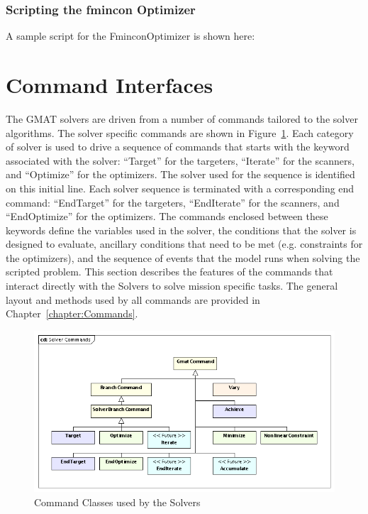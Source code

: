 \begin{quote}
\end{quote}

\subsubsection{Scripting the fmincon Optimizer}

A sample script for the FminconOptimizer is shown here:

\begin{quote}
\end{quote}

\section{Command Interfaces}

The GMAT solvers are driven from a number of commands tailored to the solver algorithms.  The solver
specific commands are shown in Figure~\ref{figure:SolverCommandClasses}.  Each
category of solver is used to drive a sequence of commands that starts with the keyword associated
with the solver: ``Target'' for the targeters, ``Iterate'' for the scanners, and ``Optimize'' for
the optimizers.  The solver used for the sequence is identified on this initial line.  Each solver
sequence is terminated with a corresponding end command: ``EndTarget'' for the targeters,
``EndIterate'' for the scanners, and ``EndOptimize'' for the optimizers.  The commands enclosed
between these keywords define the variables used in the solver, the conditions that the solver is
designed to evaluate, ancillary conditions that need to be met (e.g. constraints for the
optimizers), and the sequence of events that the model runs when solving the scripted problem.  This
section describes the features of the commands that interact directly with the Solvers to solve
mission specific tasks.  The general layout and methods used by all commands are provided in
Chapter~\ref{chapter:Commands}.

\begin{figure}[htb]
\begin{center}
\includegraphics[345,185]{Images/SolverCommands.png}
\caption{\label{figure:SolverCommandClasses}Command Classes used by the Solvers}
\end{center}
\end{figure}

